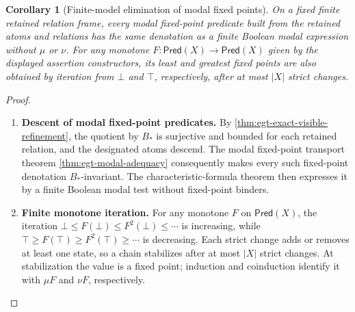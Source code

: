 \documentclass[11pt,a4paper]{article}
\numberwithin{equation}{section}
\newtheorem{corollary}[theorem]{Corollary}
\theoremstyle{definition}
\theoremstyle{remark}
\theoremstyle{plain}
\begin{document}
\begin{corollary}[Finite-model elimination of modal fixed points]
\label{cor:egt-finite-fixedpoint-elimination}
On a fixed finite retained relation frame, every modal fixed-point
predicate built from the retained atoms and relations has the same
denotation as a finite Boolean modal expression without $\mu$ or $\nu$.
For any monotone $F:\mathsf{Pred}(X)\to\mathsf{Pred}(X)$ given by the
displayed assertion constructors, its least and greatest fixed points
are also obtained by iteration from $\bot$ and $\top$, respectively,
after at most $|X|$ strict changes.
\end{corollary}
\begin{proof}
\leavevmode
\begin{enumerate}[label=\textup{(\arabic*)},leftmargin=*,itemsep=4pt,topsep=3pt]
  \item \textbf{Descent of modal fixed-point predicates.}
By \cref{thm:egt-exact-visible-refinement}, the quotient by $B_*$ is
surjective and bounded for each retained relation, and the designated
atoms descend. The modal fixed-point transport theorem
\ref{thm:egt-modal-adequacy} consequently makes every such fixed-point
denotation $B_*$-invariant. The characteristic-formula theorem then
expresses it by a finite Boolean modal test without fixed-point binders.
  \item \textbf{Finite monotone iteration.} For any monotone $F$ on
$\mathsf{Pred}(X)$, the iteration $\bot\leq F(\bot)\leq
F^2(\bot)\leq\cdots$ is increasing, while
$\top\geq F(\top)\geq F^2(\top)\geq\cdots$ is decreasing.
Each strict change adds or removes at least one state, so a chain
stabilizes after at most $|X|$ strict changes. At stabilization the
value is a fixed point; induction and coinduction identify it with
$\mu F$ and $\nu F$, respectively.
\end{enumerate}
\end{proof}
\end{document}
